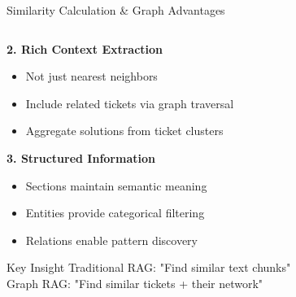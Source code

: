 \documentclass[10pt, aspectratio=169]{beamer}
\begin{document}
\begin{frame}{Similarity Calculation \& Graph Advantages}
\begin{columns}[T]
\begin{column}{0.5\textwidth}
            \textbf{2. Rich Context Extraction}
            \begin{itemize}
                \scriptsize
                \item Not just nearest neighbors
                \item Include related tickets via graph traversal
                \item Aggregate solutions from ticket clusters
            \end{itemize}
            
            \textbf{3. Structured Information}
            \begin{itemize}
                \scriptsize
                \item Sections maintain semantic meaning
                \item Entities provide categorical filtering
                \item Relations enable pattern discovery
            \end{itemize}
            
            \begin{alertblock}{Key Insight}
                \footnotesize
                Traditional RAG: "Find similar text chunks"\\
                Graph RAG: "Find similar tickets + their network"
            \end{alertblock}
        \end{column}
    \end{columns}
\end{frame}
\end{document}
